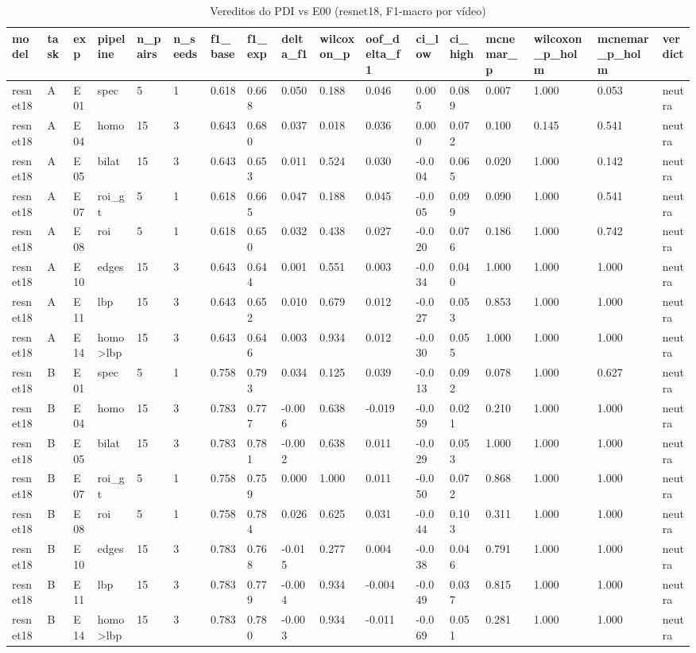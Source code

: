 \begin{table}[ht]
\centering
\caption{Vereditos do PDI vs E00 (resnet18, F1-macro por vídeo)}
\begin{tabular}{lllllllllllllllll}
\toprule
model & task & exp & pipeline & n\_pairs & n\_seeds & f1\_base & f1\_exp & delta\_f1 & wilcoxon\_p & oof\_delta\_f1 & ci\_low & ci\_high & mcnemar\_p & wilcoxon\_p\_holm & mcnemar\_p\_holm & verdict \\
\midrule
resnet18 & A & E01 & spec & 5 & 1 & 0.618 & 0.668 & 0.050 & 0.188 & 0.046 & 0.005 & 0.089 & 0.007 & 1.000 & 0.053 & neutra \\
resnet18 & A & E04 & homo & 15 & 3 & 0.643 & 0.680 & 0.037 & 0.018 & 0.036 & 0.000 & 0.072 & 0.100 & 0.145 & 0.541 & neutra \\
resnet18 & A & E05 & bilat & 15 & 3 & 0.643 & 0.653 & 0.011 & 0.524 & 0.030 & -0.004 & 0.065 & 0.020 & 1.000 & 0.142 & neutra \\
resnet18 & A & E07 & roi\_gt & 5 & 1 & 0.618 & 0.665 & 0.047 & 0.188 & 0.045 & -0.005 & 0.099 & 0.090 & 1.000 & 0.541 & neutra \\
resnet18 & A & E08 & roi & 5 & 1 & 0.618 & 0.650 & 0.032 & 0.438 & 0.027 & -0.020 & 0.076 & 0.186 & 1.000 & 0.742 & neutra \\
resnet18 & A & E10 & edges & 15 & 3 & 0.643 & 0.644 & 0.001 & 0.551 & 0.003 & -0.034 & 0.040 & 1.000 & 1.000 & 1.000 & neutra \\
resnet18 & A & E11 & lbp & 15 & 3 & 0.643 & 0.652 & 0.010 & 0.679 & 0.012 & -0.027 & 0.053 & 0.853 & 1.000 & 1.000 & neutra \\
resnet18 & A & E14 & homo>lbp & 15 & 3 & 0.643 & 0.646 & 0.003 & 0.934 & 0.012 & -0.030 & 0.055 & 1.000 & 1.000 & 1.000 & neutra \\
resnet18 & B & E01 & spec & 5 & 1 & 0.758 & 0.793 & 0.034 & 0.125 & 0.039 & -0.013 & 0.092 & 0.078 & 1.000 & 0.627 & neutra \\
resnet18 & B & E04 & homo & 15 & 3 & 0.783 & 0.777 & -0.006 & 0.638 & -0.019 & -0.059 & 0.021 & 0.210 & 1.000 & 1.000 & neutra \\
resnet18 & B & E05 & bilat & 15 & 3 & 0.783 & 0.781 & -0.002 & 0.638 & 0.011 & -0.029 & 0.053 & 1.000 & 1.000 & 1.000 & neutra \\
resnet18 & B & E07 & roi\_gt & 5 & 1 & 0.758 & 0.759 & 0.000 & 1.000 & 0.011 & -0.050 & 0.072 & 0.868 & 1.000 & 1.000 & neutra \\
resnet18 & B & E08 & roi & 5 & 1 & 0.758 & 0.784 & 0.026 & 0.625 & 0.031 & -0.044 & 0.103 & 0.311 & 1.000 & 1.000 & neutra \\
resnet18 & B & E10 & edges & 15 & 3 & 0.783 & 0.768 & -0.015 & 0.277 & 0.004 & -0.038 & 0.046 & 0.791 & 1.000 & 1.000 & neutra \\
resnet18 & B & E11 & lbp & 15 & 3 & 0.783 & 0.779 & -0.004 & 0.934 & -0.004 & -0.049 & 0.037 & 0.815 & 1.000 & 1.000 & neutra \\
resnet18 & B & E14 & homo>lbp & 15 & 3 & 0.783 & 0.780 & -0.003 & 0.934 & -0.011 & -0.069 & 0.051 & 0.281 & 1.000 & 1.000 & neutra \\
\bottomrule
\end{tabular}
\end{table}